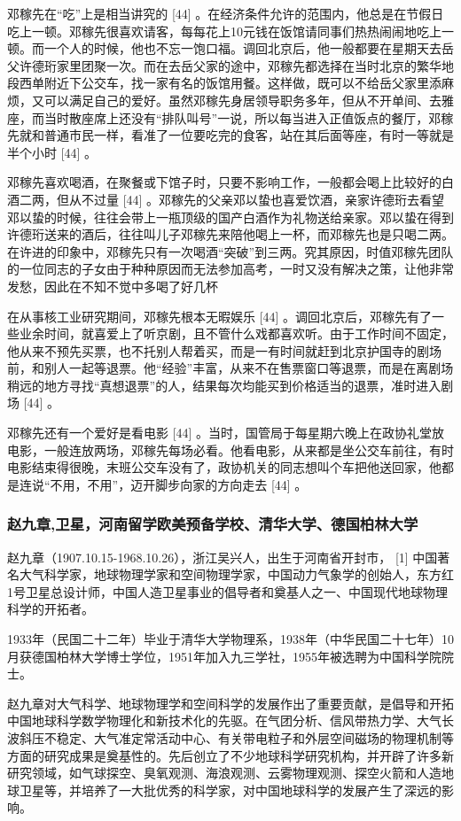 \documentclass[UTF8]{ctexart}
\begin{document}
\begin{itemize}
邓稼先在“吃”上是相当讲究的 [44]  。在经济条件允许的范围内，他总是在节假日吃上一顿。邓稼先很喜欢请客，每每花上10元钱在饭馆请同事们热热闹闹地吃上一顿。而一个人的时候，他也不忘一饱口福。调回北京后，他一般都要在星期天去岳父许德珩家里团聚一次。而在去岳父家的途中，邓稼先都选择在当时北京的繁华地段西单附近下公交车，找一家有名的饭馆用餐。这样做，既可以不给岳父家里添麻烦，又可以满足自己的爱好。虽然邓稼先身居领导职务多年，但从不开单间、去雅座，而当时散座席上还没有“排队叫号”一说，所以每当进入正值饭点的餐厅，邓稼先就和普通市民一样，看准了一位要吃完的食客，站在其后面等座，有时一等就是半个小时 [44]  。

邓稼先喜欢喝酒，在聚餐或下馆子时，只要不影响工作，一般都会喝上比较好的白酒二两，但从不过量 [44]  。邓稼先的父亲邓以蛰也喜爱饮酒，亲家许德珩去看望邓以蛰的时候，往往会带上一瓶顶级的国产白酒作为礼物送给亲家。邓以蛰在得到许德珩送来的酒后，往往叫儿子邓稼先来陪他喝上一杯，而邓稼先也是只喝二两。在许进的印象中，邓稼先只有一次喝酒“突破”到三两。究其原因，时值邓稼先团队的一位同志的子女由于种种原因而无法参加高考，一时又没有解决之策，让他非常发愁，因此在不知不觉中多喝了好几杯

在从事核工业研究期间，邓稼先根本无暇娱乐 [44]  。调回北京后，邓稼先有了一些业余时间，就喜爱上了听京剧，且不管什么戏都喜欢听。由于工作时间不固定，他从来不预先买票，也不托别人帮着买，而是一有时间就赶到北京护国寺的剧场前，和别人一起等退票。他“经验”丰富，从来不在售票窗口等退票，而是在离剧场稍远的地方寻找“真想退票”的人，结果每次均能买到价格适当的退票，准时进入剧场 [44]  。

邓稼先还有一个爱好是看电影 [44]  。当时，国管局于每星期六晚上在政协礼堂放电影，一般连放两场，邓稼先每场必看。他看电影，从来都是坐公交车前往，有时电影结束得很晚，末班公交车没有了，政协机关的同志想叫个车把他送回家，他都是连说“不用，不用”，迈开脚步向家的方向走去 [44]  。
\end{itemize}
    \subsubsection{赵九章,卫星，河南留学欧美预备学校、清华大学、德国柏林大学}
赵九章（1907.10.15-1968.10.26），浙江吴兴人，出生于河南省开封市， [1]  中国著名大气科学家，地球物理学家和空间物理学家，中国动力气象学的创始人，东方红1号卫星总设计师，中国人造卫星事业的倡导者和奠基人之一、中国现代地球物理科学的开拓者。 

1933年（民国二十二年）毕业于清华大学物理系，1938年（中华民国二十七年）10月获德国柏林大学博士学位，1951年加入九三学社，1955年被选聘为中国科学院院士。 

赵九章对大气科学、地球物理学和空间科学的发展作出了重要贡献，是倡导和开拓中国地球科学数学物理化和新技术化的先驱。在气团分析、信风带热力学、大气长波斜压不稳定、大气准定常活动中心、有关带电粒子和外层空间磁场的物理机制等方面的研究成果是奠基性的。先后创立了不少地球科学研究机构，并开辟了许多新研究领域，如气球探空、臭氧观测、海浪观测、云雾物理观测、探空火箭和人造地球卫星等，并培养了一大批优秀的科学家，对中国地球科学的发展产生了深远的影响。
\end{document}
